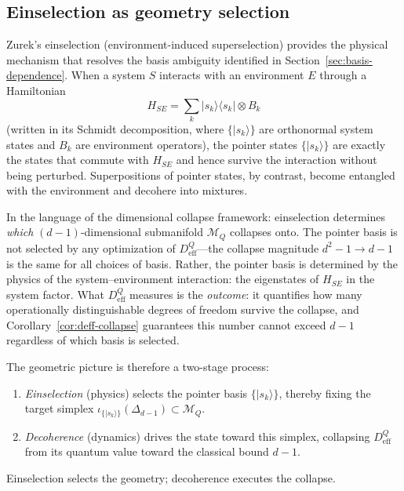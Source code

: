 \documentclass[12pt,a4paper]{article}
\theoremstyle{definition}
\theoremstyle{remark}
\begin{document}
\subsection{Einselection as geometry selection}
\label{sec:einselection}

Zurek's einselection (environment-induced superselection) \cite{zurek2003decoherence,zurek2025decoherence} provides the physical mechanism that resolves the basis ambiguity identified in Section~\ref{sec:basis-dependence}.  When a system $S$ interacts with an environment $E$ through a Hamiltonian
\begin{equation}
\label{eq:interaction-hamiltonian}
H_{SE} = \sum_k |s_k\rangle\langle s_k| \otimes B_k
\end{equation}
(written in its Schmidt decomposition, where $\{|s_k\rangle\}$ are orthonormal system states and $B_k$ are environment operators), the pointer states $\{|s_k\rangle\}$ are exactly the states that commute with $H_{SE}$ and hence survive the interaction without being perturbed.  Superpositions of pointer states, by contrast, become entangled with the environment and decohere into mixtures.

In the language of the dimensional collapse framework: einselection determines \emph{which} $(d-1)$-dimensional submanifold $\mathcal{M}_Q$ collapses onto.  The pointer basis is not selected by any optimization of $D_{\mathrm{eff}}^Q$---the collapse magnitude $d^2 - 1 \to d - 1$ is the same for all choices of basis.  Rather, the pointer basis is determined by the physics of the system--environment interaction: the eigenstates of $H_{SE}$ in the system factor.  What $D_{\mathrm{eff}}^Q$ measures is the \emph{outcome}: it quantifies how many operationally distinguishable degrees of freedom survive the collapse, and Corollary~\ref{cor:deff-collapse} guarantees this number cannot exceed $d - 1$ regardless of which basis is selected.

The geometric picture is therefore a two-stage process:
\begin{enumerate}
\item \emph{Einselection} (physics) selects the pointer basis $\{|s_k\rangle\}$, thereby fixing the target simplex $\iota_{\{|s_k\rangle\}}(\Delta_{d-1}) \subset \mathcal{M}_Q$.
\item \emph{Decoherence} (dynamics) drives the state toward this simplex, collapsing $D_{\mathrm{eff}}^Q$ from its quantum value toward the classical bound $d - 1$.
\end{enumerate}
Einselection selects the geometry; decoherence executes the collapse.
\end{document}
